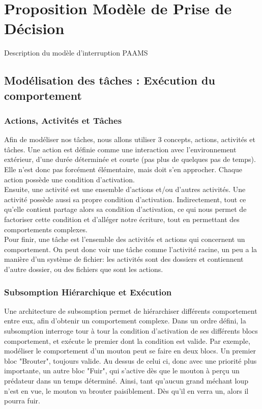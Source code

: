 \documentclass[11pt,a4paper]{report}
\begin{document}
\chapter{Proposition Modèle de Prise de Décision}
	Description du modèle d'interruption PAAMS	
	
	\section{Modélisation des tâches : Exécution du comportement}	
	
		\subsection{Actions, Activités et Tâches}
			Afin de modéliser nos tâches, nous allons utiliser 3 concepts, actions, activités et tâches. Une action est définie comme une interaction avec l'environnement extérieur, d'une durée déterminée et courte (pas plus de quelques pas de temps). Elle n'est donc pas forcément élémentaire, mais doit s'en approcher. Chaque action possède une condition d'activation.\\
			Ensuite, une activité est une ensemble d'actions et/ou d'autres activités. Une activité possède aussi sa propre condition d'activation. Indirectement, tout ce qu'elle contient partage alors sa condition d'activation, ce qui nous permet de factoriser cette condition et d'alléger notre écriture, tout en permettant des comportements complexes.\\
			Pour finir, une tâche est l'ensemble des activités et actions qui concernent un comportement. On peut donc voir une tâche comme l'activité racine, un peu a la manière d'un système de fichier: les activités sont des dossiers et contiennent d'autre dossier, ou des fichiers que sont les actions.
		\subsection{Subsomption Hiérarchique et Exécution}
		
			Une architecture de subsomption permet de hiérarchiser différents comportement entre eux, afin d'obtenir un comportement complexe. Dans un ordre défini, la subsomption interroge tour à tour la condition d'activation de ses différents blocs comportement, et exécute le premier dont la condition est valide. Par exemple, modéliser le comportement d'un mouton peut se faire en deux blocs. Un premier bloc "Brouter", toujours valide. Au dessus de celui ci, donc avec une priorité plus importante, un autre bloc "Fuir", qui s'active dès que le mouton à perçu un prédateur dans un temps déterminé. Ainsi, tant qu'aucun grand méchant loup n'est en vue, le mouton va brouter paisiblement. Dès qu'il en verra un, alors il pourra fuir.
			
\end{document}
